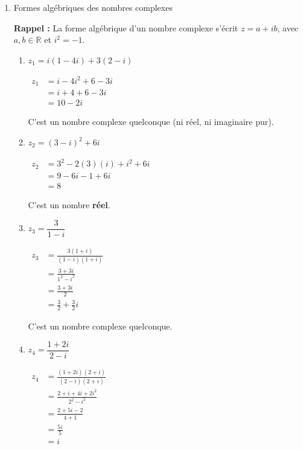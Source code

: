 \documentclass[12pt,a4paper]{article}
\begin{document}
\begin{enumerate}
    \item Formes algébriques des nombres complexes

\textbf{Rappel :} La forme algébrique d'un nombre complexe s'écrit $z = a + ib$, avec $a, b \in \mathbb{R}$ et $i^2 = -1$.

\begin{enumerate}
    \item $z_1 = i(1 - 4i) + 3(2 - i)$
    
$    
\begin{aligned}
        z_1 &= i - 4i^2 + 6 - 3i \\
        &= i + 4 + 6 - 3i \\
        &= 10 - 2i
\end{aligned}
$

    C'est un nombre complexe quelconque (ni réel, ni imaginaire pur).

    \item $z_2 = (3 - i)^2 + 6i$
    
    $    
\begin{aligned}
        z_2 &= 3^2 - 2(3)(i) + i^2 + 6i \\
        &= 9 - 6i - 1 + 6i \\
        &= 8
\end{aligned}
$

    C'est un nombre \textbf{réel}.

    \item $z_3 = \dfrac{3}{1 - i}$
    
    $    
\begin{aligned}
        z_3 &= \frac{3(1 + i)}{(1 - i)(1 + i)} \\
        &= \frac{3 + 3i}{1^2 - i^2} \\
        &= \frac{3 + 3i}{2} \\
        &= \frac{3}{2} + \frac{3}{2}i
\end{aligned}
$

    C'est un nombre complexe quelconque.

    \item $z_4 = \dfrac{1 + 2i}{2 - i}$

    $    
\begin{aligned}
        z_4 &= \frac{(1 + 2i)(2 + i)}{(2 - i)(2 + i)} \\
        &= \frac{2 + i + 4i + 2i^2}{2^2 - i^2} \\
        &= \frac{2 + 5i - 2}{4 + 1} \\
        &= \frac{5i}{5} \\
        &= i
\end{aligned}
$


\end{enumerate}
\end{enumerate}
\end{document}
